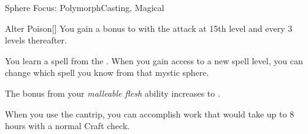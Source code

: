 \begin{feat}{Sphere Focus: Polymorph}{Casting, Magical}
\begin{freeability}{Alter Poison}[]
            \rankline
            You gain a  bonus to  with the attack at 15th level and every 3 levels thereafter.
        \end{freeability}

         You learn a spell from the  .
        When you gain access to a new spell level, you can change which spell you know from that mystic sphere.

         The bonus from your \textit{malleable flesh} ability increases to .

         When you use the  cantrip, you can accomplish work that would take up to 8 hours with a normal Craft check.
    \end{feat}

